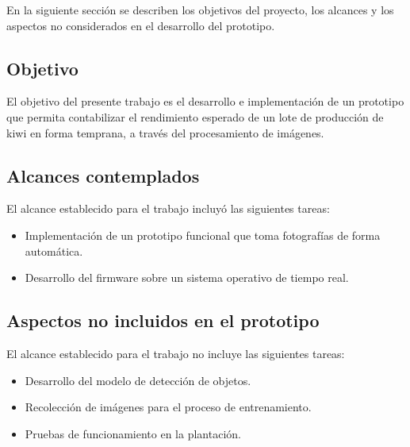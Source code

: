 En la siguiente sección se describen los objetivos del proyecto, los alcances y los aspectos no considerados en el desarrollo del prototipo.

\subsection{Objetivo}

El objetivo del presente trabajo es el desarrollo e implementación de un prototipo que permita contabilizar el rendimiento esperado de un lote de producción de kiwi en forma temprana, a través del procesamiento de imágenes.

\subsection{Alcances contemplados}
El alcance establecido para el trabajo incluyó las siguientes tareas:

\begin{itemize}
\item Implementación de un prototipo funcional que toma fotografías de forma automática.
\item Desarrollo del firmware sobre un sistema operativo de tiempo real.
\end{itemize}

\subsection{Aspectos no incluidos en el prototipo}
\label{Aspectos_no_incluidos_en_el_prototipo}
El alcance establecido para el trabajo no incluye las siguientes tareas:

\begin{itemize}
\item Desarrollo del modelo de detección de objetos.
\item Recolección de imágenes para el proceso de entrenamiento.
\item Pruebas de funcionamiento en la plantación.
\end{itemize}


